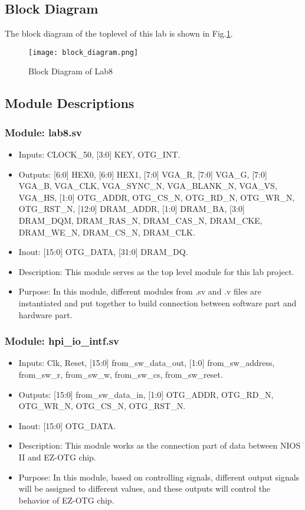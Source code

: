 \documentclass[11pt]{article}
\begin{document}
\subsection{Block Diagram}
The block diagram of the toplevel of this lab is shown in Fig.\ref{2_3}.
\begin{figure}[h]
    \centering
    \texttt{[image: block\_diagram.png]}
    \caption{Block Diagram of Lab8}
    \label{2_3}
\end{figure}

\subsection{Module Descriptions}
\subsubsection{Module: lab8.sv}
\begin{itemize}
\item Inputs: CLOCK\_50, [3:0] KEY, OTG\_INT.
\item Outputs: [6:0] HEX0, [6:0] HEX1, [7:0] VGA\_R, [7:0] VGA\_G, [7:0] VGA\_B, VGA\_CLK, VGA\_SYNC\_N, VGA\_BLANK\_N, VGA\_VS, VGA\_HS, [1:0] OTG\_ADDR, OTG\_CS\_N, OTG\_RD\_N, OTG\_WR\_N, OTG\_RST\_N, [12:0] DRAM\_ADDR, [1:0] DRAM\_BA, [3:0] DRAM\_DQM, DRAM\_RAS\_N, DRAM\_CAS\_N, DRAM\_CKE, DRAM\_WE\_N, DRAM\_CS\_N, DRAM\_CLK.
\item Inout: [15:0] OTG\_DATA, [31:0] DRAM\_DQ.
\item Description: This module serves as the top level module for this lab project. 
\item Purpose: In this module, different modules from .sv and .v files are instantiated and put together to build connection between software part and hardware part.
\end{itemize}
\subsubsection{Module: hpi\_io\_intf.sv}
\begin{itemize}
\item Inputs: Clk, Reset, [15:0] from\_sw\_data\_out, [1:0] from\_sw\_address, from\_sw\_r, from\_sw\_w, from\_sw\_cs, from\_sw\_reset.
\item Outputs: [15:0] from\_sw\_data\_in, [1:0] OTG\_ADDR, OTG\_RD\_N, OTG\_WR\_N, OTG\_CS\_N, OTG\_RST\_N.
\item Inout: [15:0] OTG\_DATA.
\item Description: This module works as the connection part of data between NIOS II and EZ-OTG chip.
\item Purpose: In this module, based on controlling signals, different output signals will be assigned to different values, and these outputs will control the behavior of EZ-OTG chip.
\end{itemize}
\end{document}
